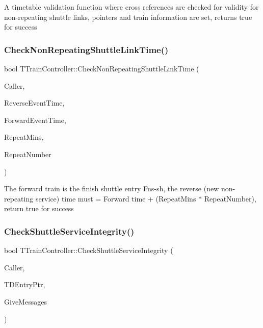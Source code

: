 A timetable validation function where cross references are checked for validity for non-\/repeating shuttle links, pointers and train information are set, returns true for success \mbox{\label{class_t_train_controller_a45168500acc985a1573602e0c00a0d9a}} 
\subsubsection{\texorpdfstring{Check\+Non\+Repeating\+Shuttle\+Link\+Time()}{CheckNonRepeatingShuttleLinkTime()}}
{\footnotesize\ttfamily bool T\+Train\+Controller\+::\+Check\+Non\+Repeating\+Shuttle\+Link\+Time (\begin{DoxyParamCaption}\item[{int}]{Caller,  }\item[{T\+Date\+Time}]{Reverse\+Event\+Time,  }\item[{T\+Date\+Time}]{Forward\+Event\+Time,  }\item[{int}]{Repeat\+Mins,  }\item[{int}]{Repeat\+Number }\end{DoxyParamCaption})}

The forward train is the finish shuttle entry \textquotesingle{}Fns-\/sh\textquotesingle{}, the reverse (new non-\/repeating service) time must = Forward time + (Repeat\+Mins $\ast$ Repeat\+Number), return true for success \mbox{\label{class_t_train_controller_a161fe7b4bbf101fc0a3f7eadd3aff9ca}} 
\subsubsection{\texorpdfstring{Check\+Shuttle\+Service\+Integrity()}{CheckShuttleServiceIntegrity()}}
{\footnotesize\ttfamily bool T\+Train\+Controller\+::\+Check\+Shuttle\+Service\+Integrity (\begin{DoxyParamCaption}\item[{int}]{Caller,  }\item[{\mbox{\hyperlink{class_t_train_data_entry}{T\+Train\+Data\+Entry}} $\ast$}]{T\+D\+Entry\+Ptr,  }\item[{bool}]{Give\+Messages }\end{DoxyParamCaption})}

